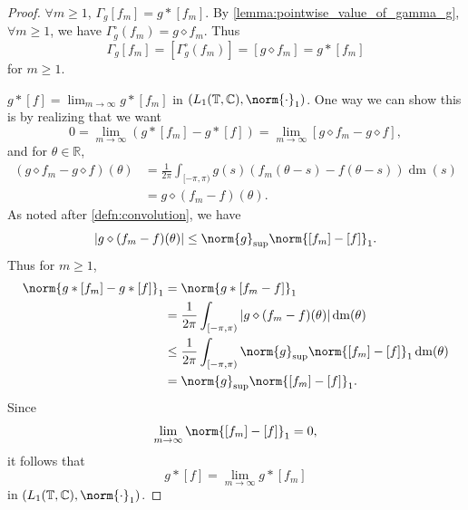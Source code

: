 \documentclass[notoc,notitlepage]{tufte-book}
\DeclareMathOperator{\dm}{dm}
\begin{document}
\begin{proof}
  \noindent
   \WTS $\forall m \geq 1$, $\Gamma_g[f_m] = g * [f_m]$.
  By \cref{lemma:pointwise_value_of_gamma_g}, $\forall m \geq 1$,
  we have $\Gamma_g^\circ(f_m) = g \diamond f_m$.
  Thus
  \begin{equation*}
    \Gamma_g[f_m] = [\Gamma_g^\circ(f_m)] = [g \diamond f_m] = g * [f_m]
  \end{equation*}
  for $m \geq 1$.

  \noindent
   \WTS $g * [f] = \lim_{m \to \infty} g * [f_m]$
  in $(L_1(\mathbb{T}, \mathbb{C}), \norm{\cdot}_1)$.
  One way we can show this is by realizing that we want
  \begin{equation*}
    0 = \lim_{m \to \infty} (g * [f_m] - g * [f])
    = \lim_{m \to \infty} [g \diamond f_m - g \diamond f],
  \end{equation*}
  and for $\theta \in \mathbb{R}$,
  \begin{align*}
    (g \diamond f_m - g \diamond f)(\theta)
    &= \frac{1}{2\pi} \int_{[-\pi, \pi)} g(s)(f_m(\theta - s) - f(\theta - s)) \dm(s) \\
    &= g \diamond (f_m - f)(\theta).
  \end{align*}
  As noted after \cref{defn:convolution}, we have
  \begin{equation*}
    \abs{g \diamond (f_m - f)(\theta)} \leq \norm{g}_{\sup} \norm{[f_m] -
    [f]}_1.
  \end{equation*}
  Thus for $m \geq 1$,
  \begin{align*}
    \norm{g * [f_m] - g * [f]}_1
    &= \norm{g * [f_m - f]}_1 \\
    &= \frac{1}{2\pi} \int_{[-\pi, \pi)} \abs{g \diamond (f_m - f)(\theta)} \dm(\theta) \\
    &\leq \frac{1}{2\pi} \int_{[-\pi, \pi)} \norm{g}_{\sup} \norm{[f_m] - [f]}_1 \dm(\theta) \\
    &= \norm{g}_{\sup} \norm{[f_m] - [f]}_1.
  \end{align*}
  Since
  \begin{equation*}
    \lim_{m \to \infty} \norm{[f_m] - [f]}_1 = 0,
  \end{equation*}
   it follows that 
  \begin{equation*}
    g * [f] = \lim_{m \to \infty} g * [f_m]
  \end{equation*}
  in $(L_1(\mathbb{T}, \mathbb{C}), \norm{\cdot}_1)$.


\end{proof}
\end{document}
